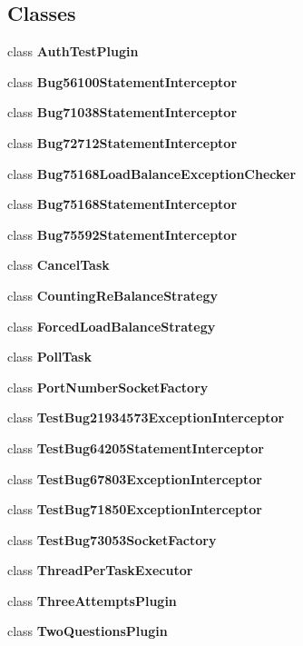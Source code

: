 \subsection*{Classes}
\begin{DoxyCompactItemize}
\item 
class {\bfseries Auth\+Test\+Plugin}
\item 
class {\bfseries Bug56100\+Statement\+Interceptor}
\item 
class {\bfseries Bug71038\+Statement\+Interceptor}
\item 
class {\bfseries Bug72712\+Statement\+Interceptor}
\item 
class {\bfseries Bug75168\+Load\+Balance\+Exception\+Checker}
\item 
class {\bfseries Bug75168\+Statement\+Interceptor}
\item 
class {\bfseries Bug75592\+Statement\+Interceptor}
\item 
class {\bfseries Cancel\+Task}
\item 
class {\bfseries Counting\+Re\+Balance\+Strategy}
\item 
class {\bfseries Forced\+Load\+Balance\+Strategy}
\item 
class {\bfseries Poll\+Task}
\item 
class {\bfseries Port\+Number\+Socket\+Factory}
\item 
class {\bfseries Test\+Bug21934573\+Exception\+Interceptor}
\item 
class {\bfseries Test\+Bug64205\+Statement\+Interceptor}
\item 
class {\bfseries Test\+Bug67803\+Exception\+Interceptor}
\item 
class {\bfseries Test\+Bug71850\+Exception\+Interceptor}
\item 
class {\bfseries Test\+Bug73053\+Socket\+Factory}
\item 
class {\bfseries Thread\+Per\+Task\+Executor}
\item 
class {\bfseries Three\+Attempts\+Plugin}
\item 
class {\bfseries Two\+Questions\+Plugin}
\end{DoxyCompactItemize}
